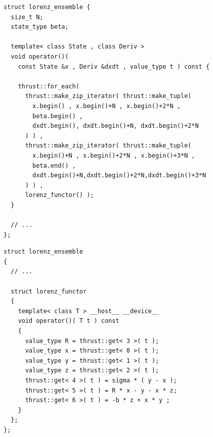 \begin{frame}[fragile]


 \begin{lstlisting}[basicstyle=\scriptsize\ttfamily]
struct lorenz_ensemble {
  size_t N;
  state_type beta;

  template< class State , class Deriv >
  void operator()(
    const State &x , Deriv &dxdt , value_type t ) const {
  
    thrust::for_each(
      thrust::make_zip_iterator( thrust::make_tuple(
        x.begin() , x.begin()+N , x.begin()+2*N ,
        beta.begin() ,
        dxdt.begin(), dxdt.begin()+N, dxdt.begin()+2*N
      ) ) ,
      thrust::make_zip_iterator( thrust::make_tuple(
        x.begin()+N , x.begin()+2*N , x.begin()+3*N ,
        beta.end() ,
        dxdt.begin()+N,dxdt.begin()+2*N,dxdt.begin()+3*N
      ) ) ,
      lorenz_functor() );
  }

  // ...
};
 \end{lstlisting}


\end{frame}


\begin{frame}[fragile]


 \begin{lstlisting}[basicstyle=\scriptsize\ttfamily]
struct lorenz_ensemble
{
  // ...

  struct lorenz_functor
  {
    template< class T > __host__ __device__
    void operator()( T t ) const
    {
      value_type R = thrust::get< 3 >( t );
      value_type x = thrust::get< 0 >( t );
      value_type y = thrust::get< 1 >( t );
      value_type z = thrust::get< 2 >( t );
      thrust::get< 4 >( t ) = sigma * ( y - x );
      thrust::get< 5 >( t ) = R * x - y - x * z;
      thrust::get< 6 >( t ) = -b * z + x * y ;
    }
  };
};
 \end{lstlisting}


\end{frame}








\begin{frame}

\end{frame}


